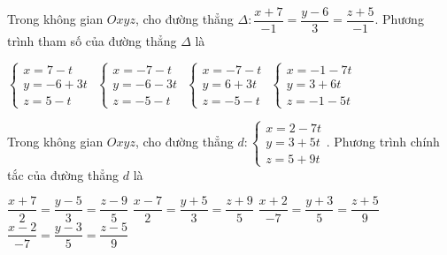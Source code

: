 \documentclass[12pt,a4paper]{article}
\begin{document}
\begin{ex}
 Trong không gian ${Oxyz}$, cho đường thẳng ${\Delta}: \dfrac{x + 7}{-1}=\dfrac{y - 6}{3}=\dfrac{z + 5}{-1}$. Phương trình tham số của đường thẳng ${\Delta}$ là
 
\choice
{ $\left\{ \begin{array}{l}x = 7-t\\ y = -6+3t\\z = 5-t\end{array} \right.$ }
   { $\left\{ \begin{array}{l}x = -7-t\\ y = -6-3t\\z = -5-t\end{array} \right.$ }
     { \True $\left\{ \begin{array}{l}x = -7-t\\ y = 6+3t\\z = -5-t\end{array} \right.$ }
    { $\left\{ \begin{array}{l}x = -1-7t\\ y = 3+6t\\z = -1-5t\end{array} \right.$ }
\end{ex}

\begin{ex}
 Trong không gian ${Oxyz}$, cho đường thẳng ${d}:\left\{ \begin{array}{l}x = 2-7t\\ y = 3+5t\\z = 5+9t\end{array} \right.$. Phương trình chính tắc của đường thẳng ${d}$ là
 
\choice
{ $\dfrac{x + 7}{2}=\dfrac{y - 5}{3}=\dfrac{z - 9}{5}$ }
   { $\dfrac{x - 7}{2}=\dfrac{y + 5}{3}=\dfrac{z + 9}{5}$ }
     { $\dfrac{x + 2}{-7}=\dfrac{y + 3}{5}=\dfrac{z + 5}{9}$ }
    { \True $\dfrac{x - 2}{-7}=\dfrac{y - 3}{5}=\dfrac{z - 5}{9}$ }
\end{ex}
\end{document}
